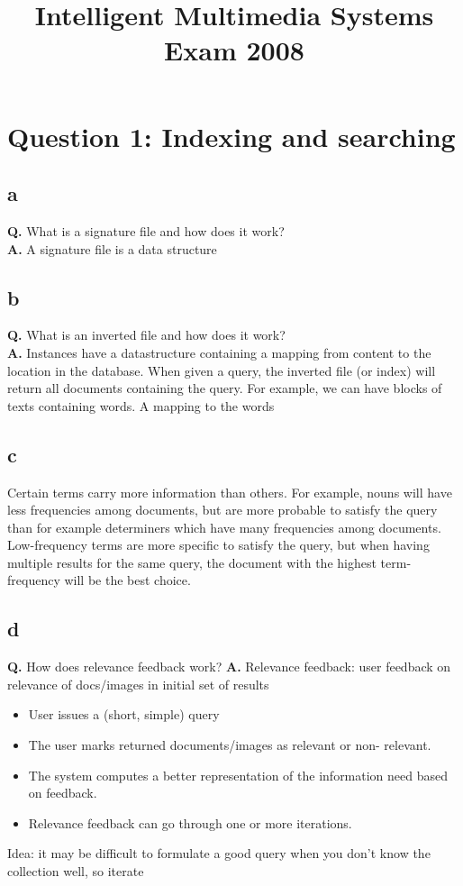 \documentclass[a4paper,11pt]{article}
\title{Intelligent Multimedia Systems \\ Exam 2008}
\newcommand{\tbf}{\textbf}
\begin{document}
	\maketitle
	\section*{Question 1: Indexing and searching}
	
	\subsection*{a}
	\tbf{Q.} What is a signature file and how does it work? \\
	\tbf{A.} A signature file is a data structure 
	
	\subsection*{b}
	\tbf{Q.} What is an inverted file and how does it work? \\
	\tbf{A.} Instances have a datastructure containing a mapping from content to the location in the database. When given a query, the inverted file (or index) will return all documents containing the query. For example, we can have blocks of texts containing words. A mapping to the words
	
	\subsection*{c} Certain terms carry more information than others. For example, nouns will have less frequencies among documents, but are more probable to satisfy the query than for example determiners which have many frequencies among documents. Low-frequency terms are more specific to satisfy the query, but when having multiple results for the same query, the document with the highest term-frequency will be the best choice.
	
	\subsection*{d}
	\tbf{Q.} How does relevance feedback work?
	\tbf{A.} Relevance feedback: user feedback on relevance of docs/images in initial set of results
	\begin{itemize}
		\item User issues a (short, simple) query
		\item The user marks returned documents/images as relevant or non- relevant.
		\item The system computes a better representation of the information need based on feedback.
		\item Relevance feedback can go through one or more iterations.
	\end{itemize}
	Idea: it may be difficult to formulate a good query when you don't know the collection well, so iterate
\end{document}
